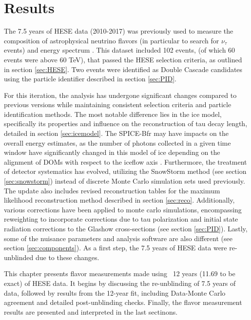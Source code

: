 \setchapterpreamble[u]{\margintoc}
\chapter{Results}
The 7.5 years of HESE data (2010-2017) was previously used to measure the composition of astrophysical neutrino flavors  (in particular to search for $\nu_{\tau}$ events) and energy spectrum . This dataset included 102 events, (of which 60 events were above 60 TeV), that passed the HESE selection criteria, as outlined in section \ref{sec:HESE}. Two events were identified as Double Cascade candidates using the particle identifier described in section \ref{sec:PID}. 

For this iteration, the analysis has undergone significant changes compared to previous versions while maintaining consistent selection criteria and particle identification methods. The most notable difference lies in the ice model, specifically its properties and influence on the reconstruction of tau decay length, detailed in section \ref{sec:icemodel}. The SPICE-Bfr may have impacts on the overall energy estimates, as the number of photons collected in a given time window have significantly changed in this model of ice depending on the alignment of DOMs with respect to the iceflow axis . Furthermore, the treatment of detector systematics has evolved, utilizing the SnowStorm method (see section \ref{sec:snowstorm}) instead of discrete Monte Carlo simulation sets used previously. The update also includes revised reconstruction tables  for the maximum likelihood reconstruction method described in section \ref{sec:reco}. Additionally, various corrections have been applied to monte carlo simulations, encompassing reweighting to incorporate corrections due to tau polarization and initial state radiation corrections to the Glashow cross-sections (see section \ref{sec:PID}). Lastly, some of the nuisance parameters and analysis software are also different (see section \ref{sec:components}). As a first step, the 7.5 years of HESE data were re-unblinded due to these changes.

This chapter presents flavor measurements made using ~12 years (11.69 to be exact) of HESE data. It begins by discussing the re-unblinding of 7.5 years of data, followed by results from the 12-year fit, including Data-Monte Carlo agreement and detailed post-unblinding checks. Finally, the flavor measurement results are presented and interpreted in the last sectinons.

